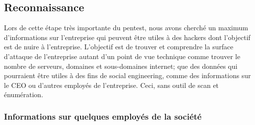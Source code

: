 \documentclass[french,oneside]{article}
\begin{document}
\subsection{Reconnaissance}

Lors de cette étape très importante du pentest, nous avons cherché un maximum d'informations sur l'entreprise qui peuvent être utiles à des hackers dont l'objectif est de nuire à l'entreprise. L'objectif est de trouver et comprendre la surface d'attaque de l'entreprise autant d'un point de vue technique comme trouver le nombre de serveurs, domaines et sous-domaines internet; que des données qui pourraient être utiles à des fins de social engineering, comme des informations sur le CEO ou d'autres employés de l'entreprise. Ceci, sans outil de scan et énumération.



\subsubsection{Informations sur quelques employés de la société}
\end{document}
